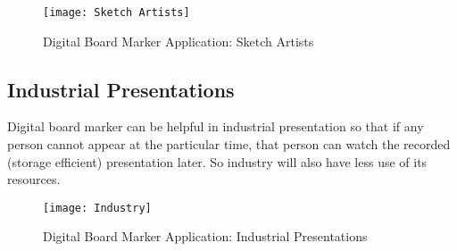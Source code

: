 \begin{figure}[h]
  \centering
  \texttt{[image: Sketch Artists]}
  \caption{Digital Board Marker Application: Sketch Artists}
\end{figure}

\bigskip

\subsection{Industrial Presentations}
Digital board marker can be helpful in industrial presentation so that if any person cannot appear at the particular time, that person can watch the recorded (storage efficient) presentation later. So industry will also have less use of its resources.

\bigskip

\begin{figure}[h]
  \centering
  \texttt{[image: Industry]}
  \caption{Digital Board Marker Application: Industrial Presentations}
\end{figure}

\bigskip













